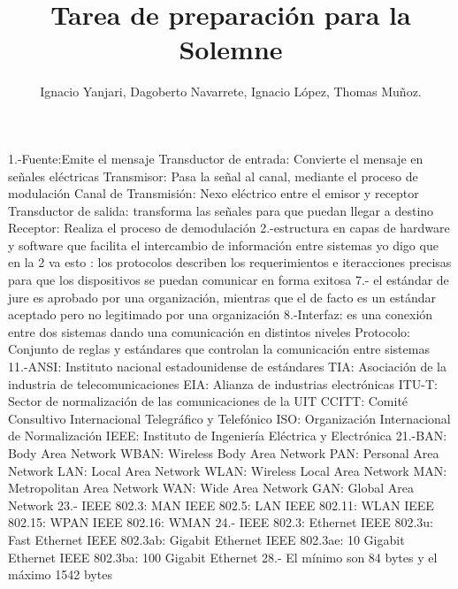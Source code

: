 \documentclass{udparticle}
\title{Tarea de preparación para la Solemne}
\author{Ignacio Yanjari, Dagoberto Navarrete, Ignacio López, Thomas Muñoz.}
\begin{document}
\maketitle
\begin{enumerate}
1.-Fuente:Emite el mensaje
Transductor de entrada: Convierte el mensaje en señales eléctricas
Transmisor: Pasa la señal al canal, mediante el proceso de modulación
Canal de Transmisión: Nexo eléctrico entre el emisor y receptor
Transductor de salida: transforma las señales para que puedan llegar a destino
Receptor: Realiza el proceso de demodulación 
2.-estructura en capas de hardware y software que facilita el intercambio de información entre sistemas
yo digo que en la 2 va esto : los protocolos describen los requerimientos e iteracciones precisas para que los
dispositivos se puedan comunicar en forma exitosa
7.- el estándar de jure es aprobado por una organización, mientras que el de facto es un estándar aceptado pero no legitimado por una organización
8.-Interfaz: es una conexión entre dos sistemas dando una comunicación en distintos niveles
Protocolo: Conjunto de reglas y estándares que controlan la comunicación entre sistemas
11.-ANSI: Instituto nacional estadounidense de estándares
TIA: Asociación de la industria de telecomunicaciones
EIA: Alianza de industrias electrónicas
ITU-T: Sector de normalización de las comunicaciones de la UIT
CCITT: Comité Consultivo Internacional Telegráfico y Telefónico
ISO: Organización Internacional de Normalización
IEEE: Instituto de Ingeniería Eléctrica y Electrónica
21.-BAN: Body Area Network
WBAN: Wireless Body Area Network
PAN: Personal Area Network
LAN: Local Area Network
WLAN: Wireless Local Area Network
MAN: Metropolitan Area Network
WAN: Wide Area Network
GAN: Global Area Network
23.- IEEE 802.3: MAN
IEEE 802.5: LAN
IEEE 802.11: WLAN
IEEE 802.15: WPAN
IEEE 802.16: WMAN
24.- IEEE 802.3: Ethernet
IEEE   802.3u: Fast Ethernet
IEEE  802.3ab: Gigabit Ethernet
IEEE 802.3ae: 10 Gigabit Ethernet
IEEE 802.3ba: 100 Gigabit Ethernet
28.- El mínimo son 84 bytes y el máximo 1542 bytes

\end{enumerate}
\end{document}
